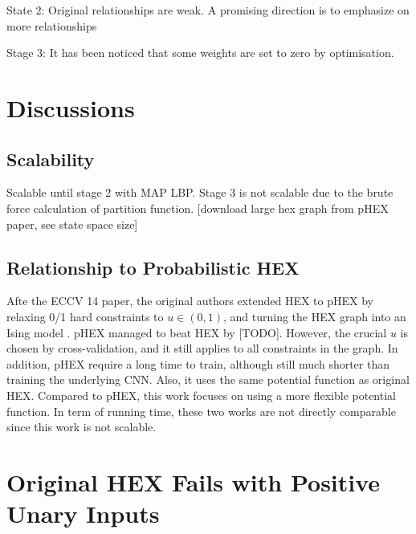 \documentclass[11pt,a4paper]{article}
\begin{document}
State 2: Original relationships are weak. A promising direction is to emphasize on more relationships

Stage 3: It has been noticed that some weights are set to zero by optimisation.

\clearpage
\section{Discussions}
\subsection{Scalability}

Scalable until stage 2 with MAP LBP. Stage 3 is not scalable due to the brute force calculation of partition function. [download large hex graph from pHEX paper, see state space size]

\subsection{Relationship to Probabilistic HEX}

Afte the ECCV 14 paper, the original authors extended HEX to pHEX by relaxing 0/1 hard constraints to $u\in(0,1)$, and turning the HEX graph into an Ising model \cite{ding2015probabilistic}. pHEX managed to beat HEX by [TODO]. However, the crucial $u$ is chosen by cross-validation, and it still applies to all constraints in the graph. In addition, pHEX require a long time to train, although still much shorter than training the underlying CNN. Also, it uses the same potential function as original HEX. Compared to pHEX, this work focuses on using a more flexible potential function. In term of running time, these two works are not directly comparable since this work is not scalable.

\clearpage
\appendix
\section{Original HEX Fails with Positive Unary Inputs}
\label{sec:fail}
\end{document}
